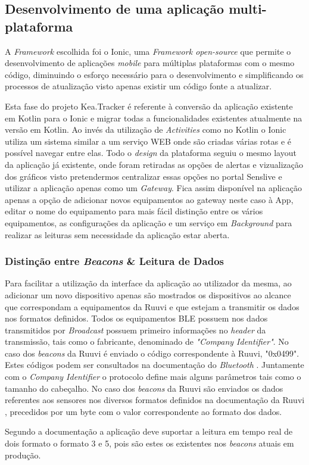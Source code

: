 \subsection{Desenvolvimento de uma aplicação multi-plataforma}

\par A \textit{Framework} escolhida foi o Ionic, uma \textit{Framework open-source} que permite o desenvolvimento de aplicações \textit{mobile} para múltiplas plataformas com o mesmo código, diminuindo o esforço necessário para o desenvolvimento e simplificando os processos de atualização visto apenas existir um código fonte a atualizar. 

\par Esta fase do projeto Kea.Tracker é referente à conversão da aplicação existente em Kotlin para o Ionic e migrar todas a funcionalidades existentes atualmente na versão em Kotlin. 
Ao invés da utilização de \textit{Activities} como no Kotlin o Ionic utiliza um sistema similar a um serviço WEB onde são criadas várias rotas e é possível navegar entre elas. Todo o \textit{design} da plataforma seguiu o mesmo layout da aplicação já existente, onde foram retiradas as opções de alertas e vizualização dos gráficos visto pretendermos centralizar essas opções no portal Senslive e utilizar a aplicação apenas como um \textit{Gateway}. Fica assim disponível na aplicação apenas a opção de adicionar novos equipamentos ao gateway neste caso à App, editar o nome do equipamento para mais fácil distinção entre os vários equipamentos, as configurações da aplicação e um serviço em \textit{Background} para realizar as leituras sem necessidade da aplicação estar aberta.
	
\subsubsection{Distinção entre \textit{Beacons} \& Leitura de Dados  }

\par Para facilitar a utilização da interface da aplicação ao utilizador da mesma, ao adicionar um novo dispositivo apenas são mostrados os dispositivos ao alcance que correspondam a equipamentos da Ruuvi e que estejam a transmitir os dados nos formatos definidos. Todos os equipamentos BLE possuem nos dados transmitidos por \textit{Broadcast} possuem primeiro informações no \textit{header} da transmissão, tais como o fabricante, denominado de \textit{"Company Identifier"}. No caso dos \textit{beacons} da Ruuvi é enviado o código  correspondente à Ruuvi, "0x0499". Estes códigos podem ser consultados na documentação do \textit{Bluetooth} \cite{companySI}. Juntamente com o \textit{Company Identifier} o protocolo define mais alguns parâmetros tais como o tamanho do cabeçalho. No caso dos \textit{beacons} da Ruuvi são enviados os dados referentes aos sensores nos diversos formatos definidos na documentação da Ruuvi \cite{GitHubRuuvi}, precedidos por um byte com o valor correspondente  ao formato dos dados.
\par Segundo a documentação a aplicação deve suportar a leitura em tempo real de dois formato o formato 3 e 5, pois são estes os existentes nos \textit{beacons} atuais em produção.



